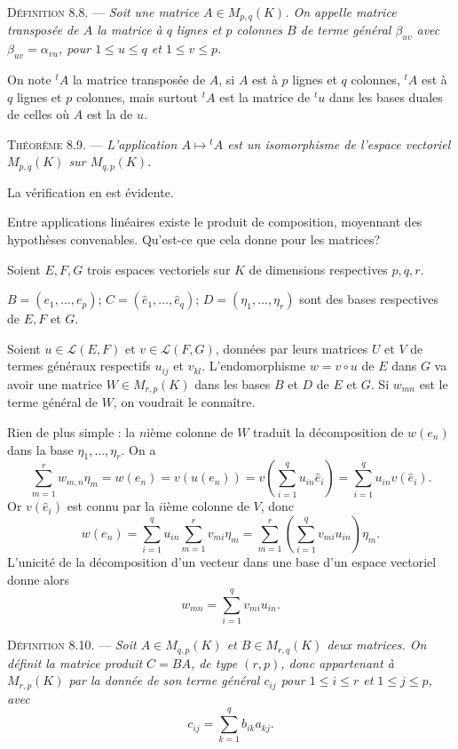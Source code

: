 \medskip\noindent\textsc{Définition 8.8.} --- \emph{Soit une matrice $A\in M_{p,q}(K)$. On appelle matrice transposée de $A$ la matrice à $q$ lignes et $p$ colonnes $B$ de terme général $\beta_{uv}$ avec $\beta_{uv}=\alpha_{vu}$, pour $1\le u\le q$ et $1\le v\le p$.}

On note ${}^tA$ la matrice transposée de $A$, si $A$ est à $p$ lignes et $q$ colonnes, ${}^tA$ est à $q$ lignes et $p$ colonnes, mais surtout ${}^tA$ est la matrice de ${}^tu$ dans les bases duales de celles où $A$ est la  de $u$.

\medskip\noindent\textsc{Théorème 8.9.} --- \emph{L'application $A\longmapsto{}^tA$ est un isomorphisme de l'espace vectoriel $M_{p,q}(K)$ sur $M_{q,p}(K)$.}

La vérification en est évidente. \bookend


Entre applications linéaires existe le produit de composition, moyennant des hypothèses convenables. Qu'est-ce que cela donne pour les matrices?

Soient $E,F,G$ trois espaces vectoriels sur $K$ de dimensions respectives $p,q,r$.

$B=(e_1,\ldots,e_p)$; $C=(\hat e_1,\ldots,\hat e_q)$; $D=(\eta_1,\ldots,\eta_r)$ sont des bases respectives de $E,F$ et $G$.

Soient $u\in\mathcal L(E,F)$ et $v\in\mathcal L(F,G)$, données par leurs matrices $U$ et $V$ de termes généraux respectifs $u_{ij}$ et $v_{kl}$. L'endomorphisme $w=v\circ u$ de $E$ dans $G$ va avoir une matrice $W\in M_{r,p}(K)$ dans les bases $B$ et $D$ de $E$ et $G$. Si $w_{mn}$ est le terme général de $W$, on voudrait le connaître.

Rien de plus simple : la $n$ième colonne de $W$ traduit la décomposition de $w(e_n)$ dans la base $\eta_1,\ldots,\eta_r$. On a
\[
\sum_{m=1}^r w_{m,n}\eta_m=w(e_n)=v(u(e_n))
=v\left(\sum_{i=1}^q u_{in}\hat e_i\right)
=\sum_{i=1}^q u_{in}v(\hat e_i).
\]
Or $v(\hat e_i)$ est connu par la $i$ième colonne de $V$, donc
\[
w(e_n)=\sum_{i=1}^q u_{in}\sum_{m=1}^r v_{mi}\eta_m
=\sum_{m=1}^r\left(\sum_{i=1}^q v_{mi}u_{in}\right)\eta_m.
\]
L'unicité de la décomposition d'un vecteur dans une base d'un espace vectoriel donne alors
\[
w_{mn}=\sum_{i=1}^q v_{mi}u_{in}.
\]

\medskip\noindent\textsc{Définition 8.10.} --- \emph{Soit $A\in M_{q,p}(K)$ et $B\in M_{r,q}(K)$ deux matrices. On définit la matrice produit $C=BA$, de type $(r,p)$, donc appartenant à $M_{r,p}(K)$ par la donnée de son terme général $c_{ij}$ pour $1\le i\le r$ et $1\le j\le p$, avec
\[
c_{ij}=\sum_{k=1}^q b_{ik}a_{kj}.
\]}

